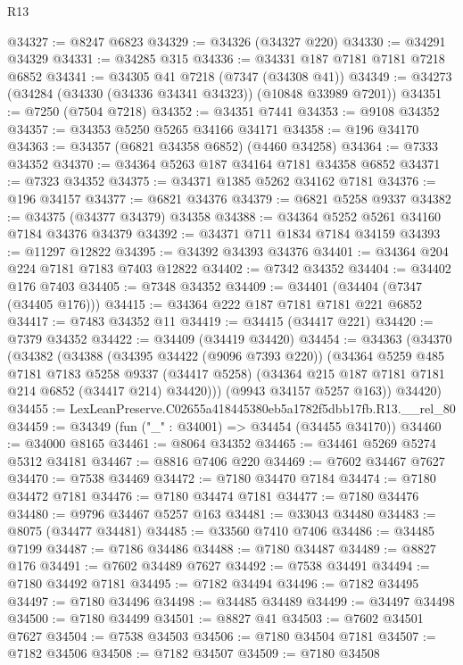 \begin{lexlean}{R13}
\begin{coremodule}
@34327 := @8247 @6823
@34329 := @34326 (@34327 @220)
@34330 := @34291 @34329
@34331 := @34285 @315
@34336 := @34331 @187 @7181 @7181 @7218 @6852
@34341 := @34305 @41 @7218 (@7347 (@34308 @41))
@34349 := @34273 (@34284 (@34330 (@34336 @34341 @34323)) (@10848 @33989 @7201))
@34351 := @7250 (@7504 @7218)
@34352 := @34351 @7441
@34353 := @9108 @34352
@34357 := @34353 @5250 @5265 @34166 @34171
@34358 := @196 @34170
@34363 := @34357 (@6821 @34358 @6852) (@4460 @34258)
@34364 := @7333 @34352
@34370 := @34364 @5263 @187 @34164 @7181 @34358 @6852
@34371 := @7323 @34352
@34375 := @34371 @1385 @5262 @34162 @7181
@34376 := @196 @34157
@34377 := @6821 @34376
@34379 := @6821 @5258 @9337
@34382 := @34375 (@34377 @34379) @34358
@34388 := @34364 @5252 @5261 @34160 @7184 @34376 @34379
@34392 := @34371 @711 @1834 @7184 @34159
@34393 := @11297 @12822
@34395 := @34392 @34393 @34376
@34401 := @34364 @204 @224 @7181 @7183 @7403 @12822
@34402 := @7342 @34352
@34404 := @34402 @176 @7403
@34405 := @7348 @34352
@34409 := @34401 (@34404 (@7347 (@34405 @176)))
@34415 := @34364 @222 @187 @7181 @7181 @221 @6852
@34417 := @7483 @34352 @11
@34419 := @34415 (@34417 @221)
@34420 := @7379 @34352
@34422 := @34409 (@34419 @34420)
@34454 := @34363
    (@34370
      (@34382
        (@34388
          (@34395 @34422 (@9096 @7393 @220))
          (@34364
            @5259
            @485
            @7181
            @7183
            @5258
            @9337
            (@34417 @5258)
            (@34364 @215 @187 @7181 @7181 @214 @6852 (@34417 @214) @34420)))
        (@9943 @34157 @5257 @163))
      @34420)
@34455 := LexLeanPreserve.C02655a418445380eb5a1782f5dbb17fb.R13.__rel_80
@34459 := @34349 (fun ("_" : @34001) => @34454 (@34455 @34170))
@34460 := @34000 @8165
@34461 := @8064 @34352
@34465 := @34461 @5269 @5274 @5312 @34181
@34467 := @8816 @7406 @220
@34469 := @7602 @34467 @7627
@34470 := @7538 @34469
@34472 := @7180 @34470 @7184
@34474 := @7180 @34472 @7181
@34476 := @7180 @34474 @7181
@34477 := @7180 @34476
@34480 := @9796 @34467 @5257 @163
@34481 := @33043 @34480
@34483 := @8075 (@34477 @34481)
@34485 := @33560 @7410 @7406
@34486 := @34485 @7199
@34487 := @7186 @34486
@34488 := @7180 @34487
@34489 := @8827 @176
@34491 := @7602 @34489 @7627
@34492 := @7538 @34491
@34494 := @7180 @34492 @7181
@34495 := @7182 @34494
@34496 := @7182 @34495
@34497 := @7180 @34496
@34498 := @34485 @34489
@34499 := @34497 @34498
@34500 := @7180 @34499
@34501 := @8827 @41
@34503 := @7602 @34501 @7627
@34504 := @7538 @34503
@34506 := @7180 @34504 @7181
@34507 := @7182 @34506
@34508 := @7182 @34507
@34509 := @7180 @34508

\end{coremodule}
\end{lexlean}
